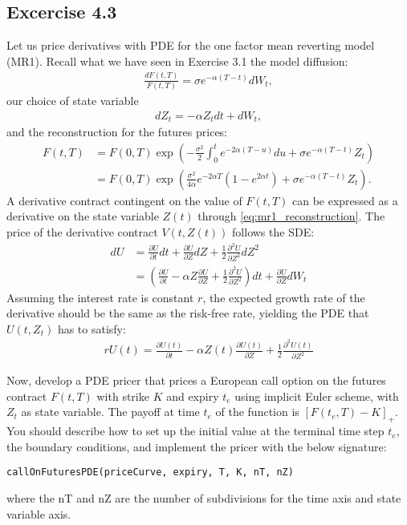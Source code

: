 \documentclass[12pt,a4paper,hidelinks,fleqn]{article}            %
\begin{document}
\subsection*{Excercise 4.3}
Let us price derivatives with PDE for the one factor mean reverting model (MR1). 
Recall what we have seen in Exercise 3.1 the model diffusion:
\begin{align*}
\frac{dF(t, T)}{F(t, T)} = \sigma e^{-\alpha (T- t)} dW_t,
\end{align*}
our choice of state variable
\begin{align}
dZ_t = -\alpha Z_t dt + dW_t,
\end{align}
and the reconstruction for the futures prices:
\begin{align}
F(t, T) & = F(0, T) \exp\left( -\frac{\sigma^2}{2} \int_0^t e^{-2\alpha (T - u)} du + \sigma e^{-\alpha(T-t)} Z_t \right) \\
        & = F(0, T) \exp\left( \frac{\sigma^2}{4\alpha} e^{-2\alpha T} \left(1 - e^{2\alpha t}\right) + \sigma e^{-\alpha(T-t)} Z_t \right).
\label{eq:mr1_reconstruction}
\end{align}
A derivative contract contingent on the value of $F(t, T)$ can be expressed as a derivative on the state variable $Z(t)$ through \eqref{eq:mr1_reconstruction}.
The price of the derivative contract $V(t, Z(t))$ follows the SDE:
\begin{align}
dU & = \frac{\partial U}{\partial t} dt + \frac{\partial U}{\partial Z} dZ + \frac{1}{2}\frac{\partial^2 U}{\partial Z^2} dZ^2 \\
   & = \left(\frac{\partial U}{\partial t} - \alpha Z\frac{\partial U}{\partial Z} + \frac{1}{2} \frac{\partial^2 U}{\partial Z^2} \right)dt + \frac{\partial U}{\partial Z} dW_t
\end{align}
Assuming the interest rate is constant $r$, the expected growth rate of the derivative should be the same as the risk-free rate, yielding the PDE that $U(t, Z_t)$ has to satisfy:
\begin{align}
rU(t) = \frac{\partial U(t)}{\partial t} - \alpha Z(t) \frac{\partial U(t)}{\partial Z} + \frac{1}{2} \frac{\partial^2 U(t)}{\partial Z^2}
\end{align}

Now, develop a PDE pricer that prices a European call option on the futures contract $F(t, T)$ with strike $K$ and expiry $t_e$ using implicit Euler scheme, with $Z_t$ as state variable.
The payoff at time $t_e$ of the function is $[F(t_e, T) - K]_+$.
You should describe how to set up the initial value at the terminal time step $t_e$, the boundary conditions, and implement the pricer with the below signature:
\begin{verbatim}
callOnFuturesPDE(priceCurve, expiry, T, K, nT, nZ)
\end{verbatim}
where the nT and nZ are the number of subdivisions for the time axis and state variable axis.
\end{document}
